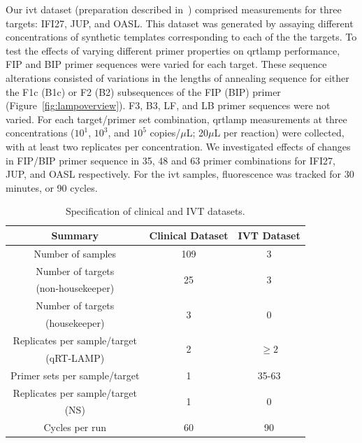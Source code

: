 \documentclass[../thesis.tex]{subfiles}
\begin{document}
Our \gls{ivt}  dataset (preparation described in~\citealp{remmel_diagnostic_2022}) comprised measurements for three targets: {IFI27}, {JUP}, and {OASL}. This dataset was generated by assaying different concentrations of synthetic  templates corresponding to each of the the targets. To test the effects of varying different primer properties on \gls{qrtlamp} performance, FIP and BIP primer sequences were varied for each target. These sequence alterations consisted of variations in the lengths of annealing sequence for either the F1c (B1c) or F2 (B2) subsequences of the FIP (BIP) primer (Figure~\ref{fig:lampoverview}). F3, B3, LF, and LB primer sequences were not varied. For each target/primer set combination, \gls{qrtlamp} measurements at three  concentrations ($10^1$, $10^3$, and $10^5$ copies/$\mu$L; 20$\mu$L per reaction) were collected, with at least two replicates per concentration. We investigated effects of changes in FIP/BIP primer sequence in 35, 48 and 63 primer combinations for {IFI27}, {JUP}, and {OASL} respectively. For the \gls{ivt} samples, fluorescence was tracked for 30 minutes, or 90 cycles. 
\begin{table}[!t] 
\centering
{\begin{tabular}{ccc}
\hline \textbf{Summary} & \textbf{Clinical Dataset} &
\textbf{IVT Dataset}  \\\hline
Number of samples & 109 & 3  \\
Number of targets  & \multirow{2}{*}{25} & \multirow{2}{*}{3} \\
(non-housekeeper) & & \\
Number of targets & \multirow{2}{*}{3} & \multirow{2}{*}{0} \\
(housekeeper) & & \\
Replicates per sample/target & \multirow{2}{*}{2} & \multirow{2}{*}{$\geq 2$} \\
(qRT-LAMP) & & \\
Primer sets per sample/target & 1 & 35-63 \\
Replicates per sample/target & \multirow{2}{*}{1} & \multirow{2}{*}{0} \\
(NS) & & \\
Cycles per run & 60 & 90 \\
\hline
\end{tabular}}
\caption{Specification of clinical and IVT datasets.\label{tab:datasets}} 
\end{table}
\end{document}
